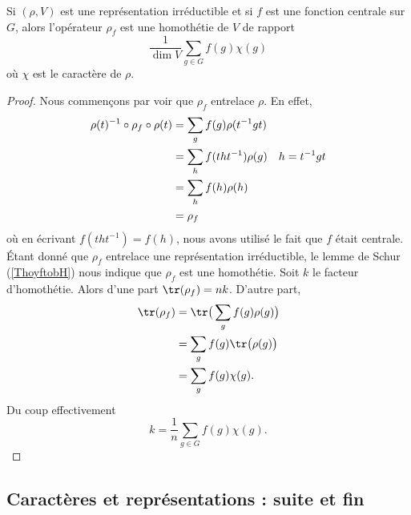 \begin{proposition}  \label{PropEAXkAY}
    Si \( (\rho,V)\) est une représentation irréductible et si \( f\) est une fonction centrale sur \( G\), alors l'opérateur \( \rho_f\) est une homothétie de \( V\) de rapport
    \begin{equation}
        \frac{1}{ \dim V }\sum_{g\in G}f(g)\chi(g)
    \end{equation}
    où \( \chi\) est le caractère de \( \rho\).
\end{proposition}

\begin{proof}
    Nous commençons par voir que \( \rho_f\) entrelace \( \rho\). En effet,
    \begin{subequations}
        \begin{align}
            \rho(t)^{-1}\circ\rho_f\circ\rho(t)&=\sum_gf(g)\rho(t^{-1}gt)\\
            &=\sum_hf(tht^{-1})\rho(g)      &\text{\( h=t^{-1}gt\)}\\
            &=\sum_hf(h)\rho(h)\\
            &=\rho_f
        \end{align}
    \end{subequations}
    où en écrivant \( f(tht^{-1})=f(h)\), nous avons utilisé le fait que \( f\) était centrale. Étant donné que \( \rho_f\) entrelace une représentation irréductible, le lemme de Schur (\ref{ThoyftobH}) nous indique que \( \rho_f\) est une homothétie. Soit \( k\) le facteur d'homothétie. Alors d'une part \( \tr(\rho_f)=nk\). D'autre part,
    \begin{subequations}
        \begin{align}
            \tr(\rho_f)&=\tr\big( \sum_gf(g)\rho(g) \big)\\
            &=\sum_gf(g)\tr\big( \rho(g) \big)\\
            &=\sum_gf(g)\chi(g).
        \end{align}
    \end{subequations}
    Du coup effectivement 
    \begin{equation}
        k=\frac{1}{ n }\sum_{g\in G}f(g)\chi(g).
    \end{equation}
\end{proof}

\subsection{Caractères et représentations : suite et fin}

